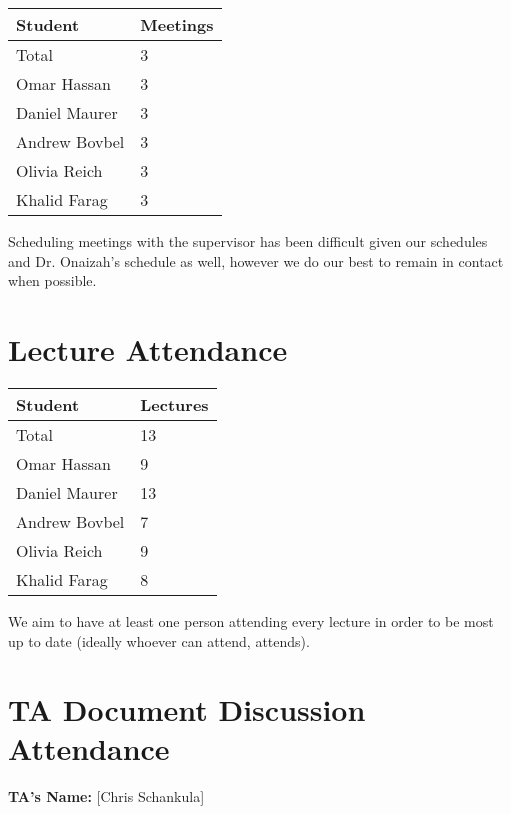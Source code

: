 \documentclass{article}
\begin{document}
\begin{table}[H]
\centering
\begin{tabular}{ll}
\toprule
\textbf{Student} & \textbf{Meetings}\\
\midrule
Total & 3\\
Omar Hassan & 3\\
Daniel Maurer & 3\\
Andrew Bovbel & 3\\
Olivia Reich & 3\\
Khalid Farag & 3\\
\bottomrule
\end{tabular}
\end{table}

Scheduling meetings with the supervisor has been difficult given our schedules and Dr. Onaizah's schedule as well, 
however we do our best to remain in contact when possible.

\section{Lecture Attendance}
\iffalse
\wss{For each team member how many lectures have they attended over the time
period of interest.  This number should be determined from the lecture issues in
the team's repo. You can find the number of lectures in the time period of
interest by looking at the
\href{https://calendar.google.com/calendar/u/0/embed?src=rnboqiaki1k2la7rpu3bn0um58@group.calendar.google.com&ctz=America/Toronto}
{Google calendar} for the capstone course.}
\fi
\begin{table}[H]
\centering
\begin{tabular}{ll}
\toprule
\textbf{Student} & \textbf{Lectures}\\
\midrule
Total & 13\\
Omar Hassan & 9\\
Daniel Maurer & 13\\
Andrew Bovbel & 7\\
Olivia Reich & 9\\
Khalid Farag & 8\\
\bottomrule
\end{tabular}
\end{table}

We aim to have at least one person attending every lecture in order to be most up to date (ideally whoever can attend, attends).

\section{TA Document Discussion Attendance}
\iffalse
\wss{For each team member how many of the informal document discussion meetings
with the TA were attended over the time period of interest.}
\fi
\noindent \textbf{TA's Name: } [Chris Schankula]
\end{document}
